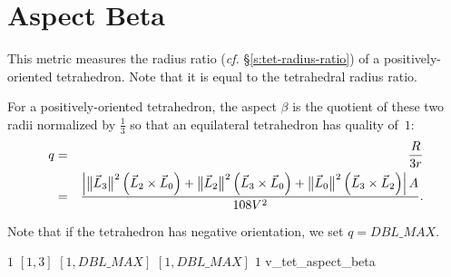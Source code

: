 \section{Aspect Beta}

This metric measures the radius ratio (\emph{cf.}
\S\ref{s:tet-radius-ratio}) of a positively-oriented tetrahedron. Note
that it is equal to the tetrahedral radius ratio.

For a positively-oriented tetrahedron, the aspect $\beta$ is the
quotient of these two radii normalized by $\frac{1}{3}$ so 
that an equilateral tetrahedron has quality of~$1$:
\begin{eqnarray*}
q & = & \frac{R}{3 r} \nonumber \\
  & = & \frac { \left| 
   \big\lVert{\vec L_3}\big\rVert^2 \left( \vec L_2 \times \vec L_0 \right) + 
   \big\lVert{\vec L_2}\big\rVert^2 \left( \vec L_3 \times \vec L_0 \right) + 
   \big\lVert{\vec L_0}\big\rVert^2 \left( \vec L_3 \times \vec L_2 \right)
   \right| A}{108 V^2}.
\end{eqnarray*}

Note that if the tetrahedron has negative orientation, we set $q = DBL\_MAX$.

%
{$1$}%
{$[1,3]$}%
{$[1,DBL\_MAX]$}%
{$[1,DBL\_MAX]$}%
{$1$}%
{\cite{par:93}}%
{v\_tet\_aspect\_beta}%
